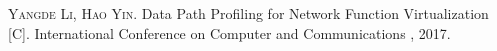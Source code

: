 
\begin{publications}{99}
    \item\textsc{Yangde Li, Hao Yin}. {Data Path Profiling for Network Function Virtualization }[C]. International Conference on Computer and Communications , 2017.
\end{publications}
